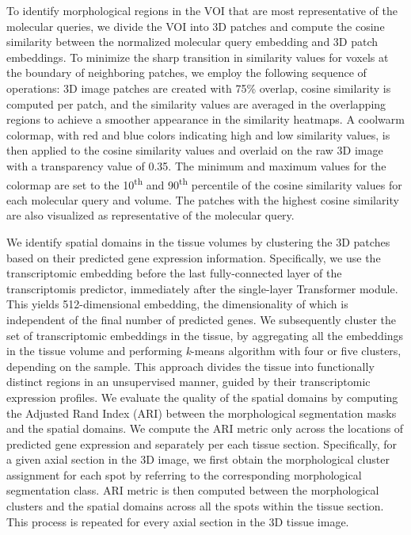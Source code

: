 To identify morphological regions in the VOI that are most representative of the molecular queries, we divide the VOI into 3D patches and compute the cosine similarity between the normalized molecular query embedding and 3D patch embeddings. To minimize the sharp transition in similarity values for voxels at the boundary of neighboring patches, we employ the following sequence of operations: 3D image patches are created with 75\% overlap, cosine similarity is computed per patch, and the similarity values are averaged in the overlapping regions to achieve a smoother appearance in the similarity heatmaps. 
A coolwarm colormap, with red and blue colors indicating high and low similarity values, is then applied to the cosine similarity values and overlaid on the raw 3D image with a transparency value of 0.35. 
The minimum and maximum values for the colormap are set to the 10\textsuperscript{th} and 90\textsuperscript{th} percentile of the cosine similarity values for each molecular query and volume. The patches with the highest cosine similarity are also visualized as representative of the molecular query.




We identify spatial domains in the tissue volumes by clustering the 3D patches based on 
their predicted gene expression information\cite{hu2021spagcn, dong2022deciphering, xiao2024integrating}. Specifically, we use the transcriptomic embedding before the last fully-connected layer of the transcriptomis predictor, immediately after the single-layer Transformer module. This yields 512-dimensional embedding, the dimensionality of which is independent of the final number of predicted genes. We subsequently cluster the set of transcriptomic embeddings in the tissue, by aggregating all the embeddings in the tissue volume and performing \textit{k}-means algorithm with four or five clusters, depending on the sample. This approach divides the tissue into functionally distinct regions in an unsupervised manner, guided by their transcriptomic expression profiles.
We evaluate the quality of the spatial domains by computing the Adjusted Rand Index (ARI) \cite{steinley2004properties} between the morphological segmentation masks and the spatial domains. We compute the ARI metric only across the locations of predicted gene expression and separately per each tissue section. Specifically, for a given axial section in the 3D image, we first obtain the morphological cluster assignment for each spot by referring to the corresponding morphological segmentation class. ARI metric is then computed between the morphological clusters and the spatial domains across all the spots within the tissue section. This process is repeated for every axial section in the 3D tissue image.


